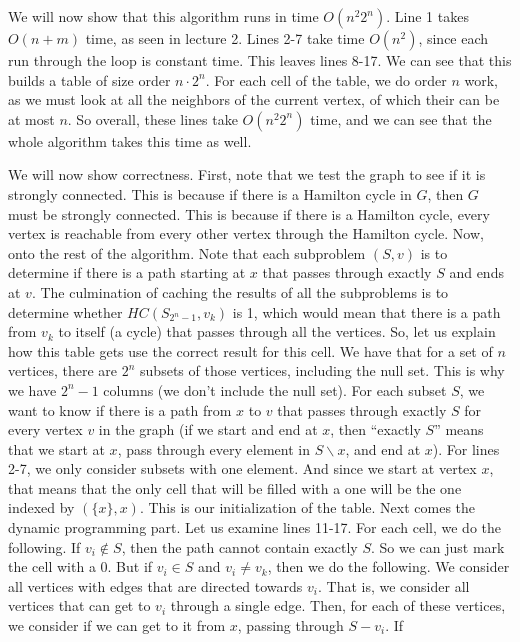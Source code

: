 \documentclass{article}
\begin{document}
\vspace{5mm}
We will now show that this algorithm runs in time $O(n^2 2^n)$. Line 1 takes
$O(n+m)$ time, as seen in lecture 2. Lines 2-7 take time $O(n^2)$, since each
run through the loop is constant time. This leaves
lines 8-17. We can see that this builds a table of size order $n \cdot 2^n$. For
each cell of the table, we do order $n$ work, as we must look at all the
neighbors of the current vertex, of which their can be at most $n$. So overall,
these lines take $O(n^2 2^n)$ time, and we can see that the whole algorithm
takes this time as well.

We will now show correctness. First, note that we test the graph to see
if it is strongly connected. This is because if there is a Hamilton cycle in
$G$, then $G$ must be strongly connected. This is because if there is a
Hamilton cycle, every vertex is reachable from every other vertex through the
Hamilton cycle. Now, onto the rest of the algorithm. Note that each subproblem $(S,v)$ is to determine
if there is a path starting at $x$ that passes through exactly $S$ and ends at
$v$. The culmination of caching the results of all the subproblems is to
determine whether $HC(S_{2^n - 1},v_k)$ is 1, which would mean that there is a path
from $v_k$ to itself (a cycle) that passes through all the vertices. So, let us
explain how this table gets use the correct result for this cell. We have that
for a set of $n$ vertices, there are $2^n$ subsets of those vertices, including
the null set. This is why we have $2^n - 1$ columns (we don't include the null
set). For each subset $S$, we want to know if there is a path from $x$ to $v$ that
passes through exactly $S$ for every vertex $v$ in the graph (if we start and
end at $x$, then ``exactly $S$'' means that we start at $x$, pass through every
element in $S \backslash x$, and end at $x$). For lines 2-7, we only consider
subsets with one element. And since we start at vertex $x$, that means that the
only cell that will be filled with a one will be the one indexed by $(\{x\},
x)$. This is our initialization of the table. Next comes the dynamic programming
part. Let us examine lines 11-17. For each cell, we do the following. If $v_i
\notin S$, then the path cannot contain exactly $S$. So we can just mark the
cell with a 0. But if $v_i \in S$ and $v_i \neq v_k$, then we do the following. We consider all
vertices with edges that are directed towards $v_i$. That is, we consider all
vertices that can get to $v_i$ through a single edge. Then, for each of these
vertices, we consider if we can get to it from $x$, passing through $S-v_i$. If
\end{document}
